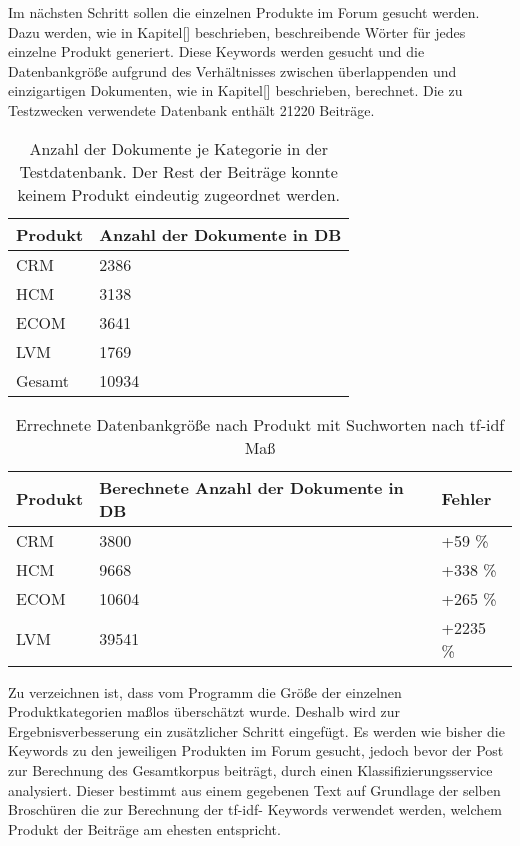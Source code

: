 Im nächsten Schritt sollen die einzelnen Produkte im Forum gesucht werden. Dazu werden, wie in Kapitel[] beschrieben, beschreibende Wörter für jedes einzelne Produkt generiert. Diese Keywords werden gesucht und die Datenbankgröße aufgrund des Verhältnisses zwischen überlappenden und einzigartigen Dokumenten, wie in Kapitel[] beschrieben, berechnet. Die zu Testzwecken verwendete Datenbank enthält 21220 Beiträge.

\begin{table}[h!]
\centering 
\begin{tabular}{ | p{3cm} | l |}
\hline
Produkt & Anzahl der Dokumente in DB \\ \hline
CRM & 2386 \\ \hline
HCM & 3138 \\ \hline
ECOM & 3641 \\ \hline
LVM & 1769 \\ \hline
Gesamt & 10934 \\ \hline
\end{tabular}
\caption{Anzahl der Dokumente je Kategorie in der Testdatenbank. Der Rest der Beiträge konnte keinem Produkt eindeutig zugeordnet werden.}
\end{table}

\newpage

\begin{table}[h!]
\begin{tabular}{ | p{3cm} | l | l |}
\hline
Produkt & Berechnete Anzahl der Dokumente in DB & Fehler\\ \hline
CRM & 3800 & +59 \%\\ \hline
HCM & 9668 & +338 \% \\ \hline
ECOM & 10604 & +265 \%\\ \hline
LVM & 39541 & +2235 \%\\ \hline
\end{tabular}
\caption{Errechnete Datenbankgröße nach Produkt mit Suchworten nach tf-idf Maß}
\end{table}

Zu verzeichnen ist, dass vom Programm die Größe der einzelnen Produktkategorien maßlos überschätzt wurde. Deshalb wird zur Ergebnisverbesserung ein zusätzlicher Schritt eingefügt. Es werden wie bisher die Keywords zu den jeweiligen Produkten im Forum gesucht, jedoch bevor der Post zur Berechnung des Gesamtkorpus beiträgt, durch einen Klassifizierungsservice \cite{n2o} analysiert. Dieser bestimmt aus einem gegebenen Text auf Grundlage der selben Broschüren die zur Berechnung der tf-idf- Keywords verwendet werden, welchem Produkt der Beiträge am ehesten entspricht.

